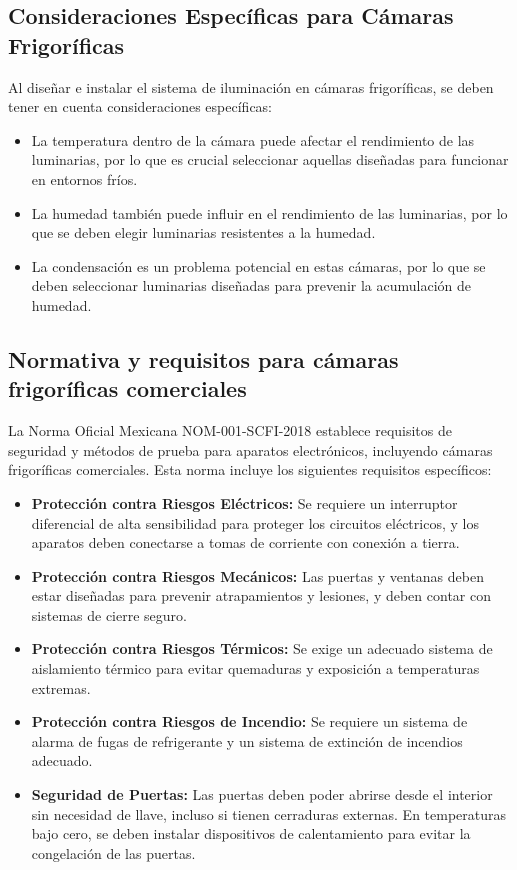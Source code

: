 \subsection{Consideraciones Específicas para Cámaras Frigoríficas}

Al diseñar e instalar el sistema de iluminación en cámaras frigoríficas, se deben tener en cuenta consideraciones específicas:

\begin{itemize}
	\item La temperatura dentro de la cámara puede afectar el rendimiento de las luminarias, por lo que es crucial seleccionar aquellas diseñadas para funcionar en entornos fríos.
	\item La humedad también puede influir en el rendimiento de las luminarias, por lo que se deben elegir luminarias resistentes a la humedad.
	\item La condensación es un problema potencial en estas cámaras, por lo que se deben seleccionar luminarias diseñadas para prevenir la acumulación de humedad.
\end{itemize}

\subsection{Normativa y requisitos para cámaras frigoríficas comerciales}

La Norma Oficial Mexicana NOM-001-SCFI-2018 establece requisitos de seguridad y métodos de prueba para aparatos electrónicos, incluyendo cámaras frigoríficas comerciales. Esta norma incluye los siguientes requisitos específicos:

\begin{itemize}
	\item \textbf{Protección contra Riesgos Eléctricos:} Se requiere un interruptor diferencial de alta sensibilidad para proteger los circuitos eléctricos, y los aparatos deben conectarse a tomas de corriente con conexión a tierra.
	\item \textbf{Protección contra Riesgos Mecánicos:} Las puertas y ventanas deben estar diseñadas para prevenir atrapamientos y lesiones, y deben contar con sistemas de cierre seguro.
	\item \textbf{Protección contra Riesgos Térmicos:} Se exige un adecuado sistema de aislamiento térmico para evitar quemaduras y exposición a temperaturas extremas.
	\item \textbf{Protección contra Riesgos de Incendio:} Se requiere un sistema de alarma de fugas de refrigerante y un sistema de extinción de incendios adecuado.
	\item \textbf{Seguridad de Puertas:} Las puertas deben poder abrirse desde el interior sin necesidad de llave, incluso si tienen cerraduras externas. En temperaturas bajo cero, se deben instalar dispositivos de calentamiento para evitar la congelación de las puertas.
\end{itemize}
